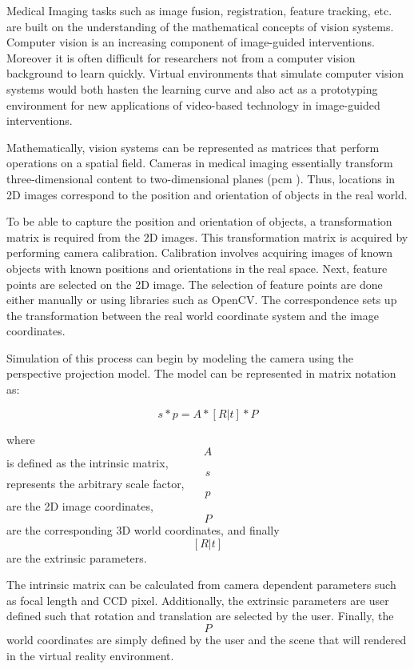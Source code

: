 \documentclass[11pt]{report}
\begin{document}
Medical Imaging tasks such as image fusion, registration, feature tracking, etc. are built on the understanding of the mathematical concepts of vision systems. Computer vision is an increasing component of image-guided interventions. Moreover it is often difficult for researchers not from a computer vision background to learn quickly. Virtual environments that simulate computer vision systems would both hasten the learning curve and also act as a prototyping environment for new applications of video-based technology in image-guided interventions. 



Mathematically, vision systems can be represented as matrices that perform operations on a spatial field. Cameras in medical imaging essentially transform three-dimensional content to two-dimensional planes (\gls{pcm} \cite{CV}). Thus, locations in 2D images correspond to the position and orientation of objects in the real world.

To be able to capture the position and orientation of objects, a transformation matrix is required from the 2D images. This transformation matrix is acquired by performing camera calibration. Calibration involves acquiring images of known objects with known positions and orientations in the real space. Next, feature points are selected on the 2D image. The selection of feature points are done either manually or using libraries such as OpenCV. The correspondence sets up the transformation between the real world coordinate system and the image coordinates.

Simulation of this process can begin by modeling the camera using the perspective projection model. The model can be represented in matrix notation as:

\begin{equation} s * p = A * [R|t] * P  \end{equation}
 
where  \[A\] is defined as the intrinsic matrix, \[s\] represents the arbitrary scale factor, \[p\] are the 2D image coordinates, \[P\] are the corresponding 3D world coordinates, and finally \[[R|t]\] are the extrinsic parameters.

The intrinsic matrix can be calculated from camera dependent parameters such as focal length and CCD pixel. Additionally, the extrinsic parameters are user defined such that rotation and translation are selected by the user. Finally, the \[P\] world coordinates are simply defined by the user and the scene that will rendered in the virtual reality environment. 
\end{document}
